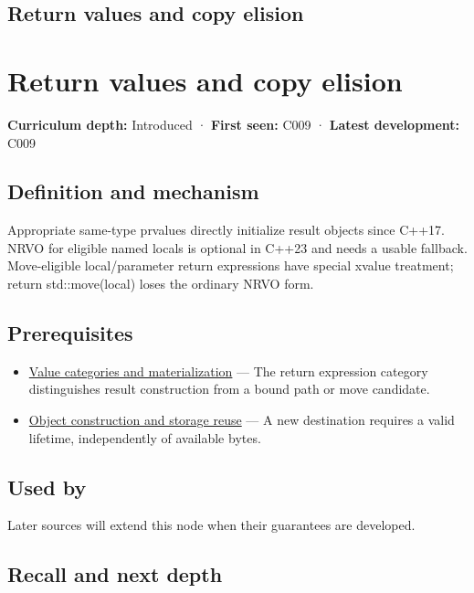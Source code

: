 \hypertarget{appendix-b08d3788c5c6}{}
\section*{Return values and copy elision}
\chapter{Return values and copy elision}\label{appendix-b08d3788c5c6-return-values-and-copy-elision}

\textbf{Curriculum depth:} Introduced · \textbf{First seen:} C009 · \textbf{Latest development:} C009

\section{Definition and mechanism}\label{appendix-b08d3788c5c6-definition-and-mechanism}

Appropriate same-type prvalues directly initialize result objects since C++17. NRVO for eligible named locals is optional in C++23 and needs a usable fallback. Move-eligible local/parameter return expressions have special xvalue treatment; return std::move(local) loses the ordinary NRVO form.

\section{Prerequisites}\label{appendix-b08d3788c5c6-prerequisites}

\begin{itemize}
\tightlist
\item
  \hyperref[appendix-1121b30eaeb0]{Value categories and materialization} --- The return expression category distinguishes result construction from a bound path or move candidate.
\item
  \hyperref[appendix-a82f9c438857]{Object construction and storage reuse} --- A new destination requires a valid lifetime, independently of available bytes.
\end{itemize}

\section{Used by}\label{appendix-b08d3788c5c6-used-by}

Later sources will extend this node when their guarantees are developed.

\section{Recall and next depth}\label{appendix-b08d3788c5c6-recall-and-next-depth}

